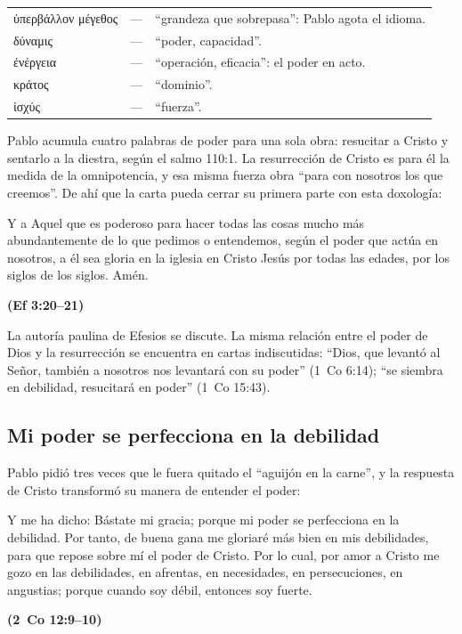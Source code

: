 \documentclass[11pt,letterpaper]{article}
\newcommand{\grc}[1]{\foreignlanguage{ancientgreek}{#1}}
\newcommand{\fuente}[1]{\par\hfill{\upshape\bfseries\small\textcolor{azul}{#1}}}
\begin{document}
\begin{filologia}[Ef 1:19--20]
\begin{tabular}{@{}L{3.2cm}L{1.6cm}L{10cm}@{}}
\grc{ὑπερβάλλον μέγεθος} & --- & ``grandeza que sobrepasa'': Pablo agota el idioma. \\[2pt]
\grc{δύναμις} & --- & ``poder, capacidad''. \\[2pt]
\grc{ἐνέργεια} & --- & ``operación, eficacia'': el poder en acto. \\[2pt]
\grc{κράτος} & --- & ``dominio''. \\[2pt]
\grc{ἰσχύς} & --- & ``fuerza''. \\
\end{tabular}
\end{filologia}

Pablo acumula cuatro palabras de poder para una sola obra: resucitar a Cristo y sentarlo a la diestra, según el salmo 110:1. La resurrección de Cristo es para él la medida de la omnipotencia, y esa misma fuerza obra ``para con nosotros los que creemos''. De ahí que la carta pueda cerrar su primera parte con esta doxología:

\begin{cita}Y a Aquel que es poderoso para hacer todas las cosas mucho más abundantemente de lo que pedimos o entendemos, según el poder que actúa en nosotros, a él sea gloria en la iglesia en Cristo Jesús por todas las edades, por los siglos de los siglos. Amén.\fuente{(Ef 3:20--21)}\end{cita}

\begin{nota}[Precisión]
La autoría paulina de Efesios se discute. La misma relación entre el poder de Dios y la resurrección se encuentra en cartas indiscutidas: ``Dios, que levantó al Señor, también a nosotros nos levantará con su poder'' (1~Co 6:14); ``se siembra en debilidad, resucitará en poder'' (1~Co 15:43).
\end{nota}

\subsection{Mi poder se perfecciona en la debilidad}

Pablo pidió tres veces que le fuera quitado el ``aguijón en la carne'', y la respuesta de Cristo transformó su manera de entender el poder:

\begin{cita}Y me ha dicho: Bástate mi gracia; porque mi poder se perfecciona en la debilidad. Por tanto, de buena gana me gloriaré más bien en mis debilidades, para que repose sobre mí el poder de Cristo. Por lo cual, por amor a Cristo me gozo en las debilidades, en afrentas, en necesidades, en persecuciones, en angustias; porque cuando soy débil, entonces soy fuerte.\fuente{(2~Co 12:9--10)}\end{cita}
\end{document}
